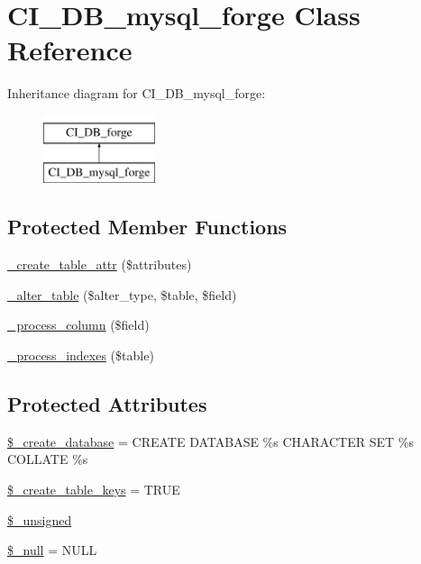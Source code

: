 \hypertarget{class_c_i___d_b__mysql__forge}{}\section{C\+I\+\_\+\+D\+B\+\_\+mysql\+\_\+forge Class Reference}
\label{class_c_i___d_b__mysql__forge}
Inheritance diagram for C\+I\+\_\+\+D\+B\+\_\+mysql\+\_\+forge\+:\begin{figure}[H]
\begin{center}
\leavevmode
\includegraphics[height=2.000000cm]{class_c_i___d_b__mysql__forge}
\end{center}
\end{figure}
\subsection*{Protected Member Functions}
\begin{DoxyCompactItemize}
\item 
\hyperlink{class_c_i___d_b__mysql__forge_a10b25326d82f6ddd9af1935e52e42b72}{\+\_\+create\+\_\+table\+\_\+attr} (\$attributes)
\item 
\hyperlink{class_c_i___d_b__mysql__forge_a41c6cae02f2fda8b429ad0afb9509426}{\+\_\+alter\+\_\+table} (\$alter\+\_\+type, \$table, \$field)
\item 
\hyperlink{class_c_i___d_b__mysql__forge_a8f38f1c5b5dddecca4befbe393f3f299}{\+\_\+process\+\_\+column} (\$field)
\item 
\hyperlink{class_c_i___d_b__mysql__forge_ae0bdb4ea3418590d1894c5b621b5ca50}{\+\_\+process\+\_\+indexes} (\$table)
\end{DoxyCompactItemize}
\subsection*{Protected Attributes}
\begin{DoxyCompactItemize}
\item 
\hyperlink{class_c_i___d_b__mysql__forge_acd23c9a8735806155f1a5d0a87c151f2}{\$\+\_\+create\+\_\+database} = \textquotesingle{}C\+R\+E\+A\+T\+E D\+A\+T\+A\+B\+A\+S\+E \%s C\+H\+A\+R\+A\+C\+T\+E\+R S\+E\+T \%s C\+O\+L\+L\+A\+T\+E \%s\textquotesingle{}
\item 
\hyperlink{class_c_i___d_b__mysql__forge_a73e07acdd35c948ad353903c2827af6e}{\$\+\_\+create\+\_\+table\+\_\+keys} = T\+R\+U\+E
\item 
\hyperlink{class_c_i___d_b__mysql__forge_aae977ae6d61fa183f0b25422b6ddc31c}{\$\+\_\+unsigned}
\item 
\hyperlink{class_c_i___d_b__mysql__forge_ae58fe6a5104d4a069a49b27533ce808f}{\$\+\_\+null} = \textquotesingle{}N\+U\+L\+L\textquotesingle{}
\end{DoxyCompactItemize}
